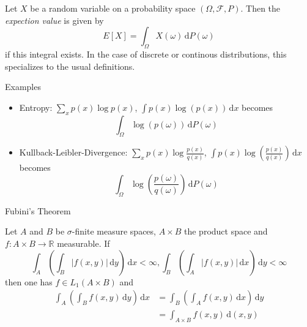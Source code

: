 \documentclass[compress]{beamer}
\newcommand{\RR}{\mathbb{R}}
\newcommand{\td}{\,\mathrm{d}}  %
\begin{document}
\begin{frame}
  \begin{definition}
    Let $X$ be a random variable on a probability space $(\Omega, \mathcal{F},
    P)$. Then the \textit{expection value} is given by
    \[
      E[X] = \int_{\Omega} X(\omega) \td P(\omega)
    \]
    if this integral exists. In the case of discrete or continous distributions,
    this specializes to the usual definitions.
  \end{definition}
\end{frame}

\begin{frame}{Examples}
  \begin{itemize}
  \item Entropy: $\sum_x p(x)\log p(x)$, $\int p(x)\log(p(x))\td x$ becomes
   \[
     \int_{\Omega} \log(p(\omega))\td P(\omega)
   \]
 \item Kullback-Leibler-Divergence: $\sum_x p(x) \log\frac{p(x)}{q(x)}$, $\int
   p(x) \log\left(\frac{p(x)}{q(x)}\right) \td x$ becomes
   \[
     \int_{\Omega} \log\left(\frac{p(\omega)}{q(\omega)}\right) \td P(\omega)
   \]
  \end{itemize}
\end{frame}

\begin{frame}{Fubini's Theorem}
  \begin{theorem}[Fubini]
    Let $A$ and $B$ be $\sigma$-finite measure spaces, $A\times B$ the product
    space and $f: A\times B \to \RR$ measurable. If
    \[
      \int_A \left( \int_B |f(x,y)| \td y\right) \td x < \infty,
      \int_B \left( \int_A |f(x,y)| \td x\right) \td y < \infty
    \]
    then one has $f \in L_1(A \times B)$ and
    \begin{align*}
      \int_A \left( \int_B f(x,y) \td y\right) \td x
        &=\int_B \left( \int_A f(x,y) \td x\right) \td y\\
        &=\int_{A\times B} f(x,y) \td (x,y)
    \end{align*}
  \end{theorem}
\end{frame}
\end{document}
